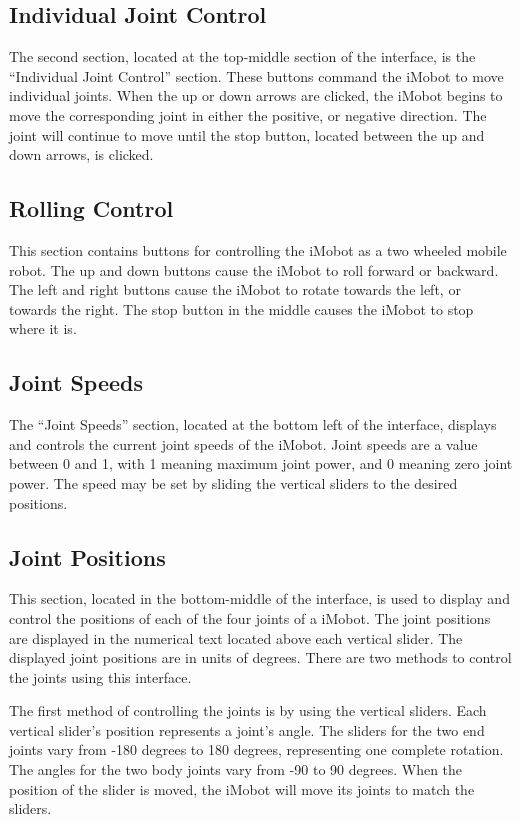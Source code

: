 \documentclass[11pt]{report}
\begin{document}
\subsection{Individual Joint Control}
The second section, located at the top-middle section of the interface,
is the ``Individual Joint Control'' section. These buttons command the
iMobot to move individual joints. When the up or down arrows are clicked,
the iMobot begins to move the corresponding joint in either the positive,
or negative direction. The joint will continue to move until the stop 
button, located between the up and down arrows, is clicked. 

\subsection{Rolling Control}
This section contains buttons for controlling the iMobot as a 
two wheeled mobile robot. The up and down buttons cause the iMobot to
roll forward or backward. The left and right buttons cause the iMobot 
to rotate towards the left, or towards the right. The stop button in the
middle causes the iMobot to stop where it is.

\subsection{Joint Speeds}
The ``Joint Speeds'' section, located at the bottom left of the interface,
displays and controls the current joint speeds of the iMobot. Joint speeds
are a value between 0 and 1, with 1 meaning maximum joint power, and 0
meaning zero joint power. The speed may be set by sliding the vertical 
sliders to the desired positions. 

\subsection{Joint Positions}
This section, located in the bottom-middle of the interface, is used to display
and control the positions of each of the four
joints of a iMobot. The joint positions are displayed in the numerical
text located above each vertical slider. The displayed joint positions are in
units of degrees.  There are two methods to control
the joints using this interface.

The first method of controlling the joints is by using the vertical sliders.
Each vertical slider's position represents a joint's angle. The sliders for the
two end joints vary from -180 degrees to 180 degrees, representing one complete
rotation. The angles for the two body joints vary from -90 to 90 degrees. When
the position of the slider is moved, the iMobot will move its joints to match the 
sliders. 
\end{document}
